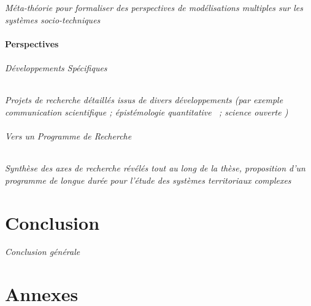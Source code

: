 \textit{Méta-théorie pour formaliser des perspectives de modélisations multiples sur les systèmes socio-techniques} 



\subsection{Perspectives}

\paragraph{Développements Spécifiques}

\textit{Projets de recherche détaillés issus de divers développements (par exemple communication scientifique 
\cite{serra2016game} ; épistémologie quantitative~\cite{raimbault2016techno} ; science ouverte
\cite{cybergeo20})}

\paragraph{Vers un Programme de Recherche}

\textit{Synthèse des axes de recherche révélés tout au long de la thèse, proposition d'un programme de longue durée pour l'étude des systèmes territoriaux complexes}



\part*{Conclusion}

\textit{Conclusion générale}



\part*{Annexes}








